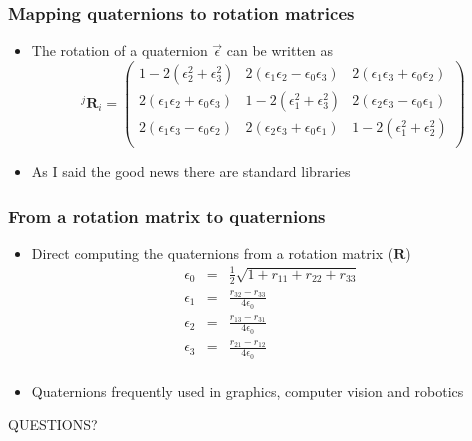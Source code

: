 \documentclass[10pt]{beamer}
\begin{document}
\begin{frame}
  \frametitle{Mapping quaternions to rotation matrices}
  \begin{itemize}
  \item The rotation of a quaternion $\vec{\epsilon}$ can be written as
    \[
      ~^{j}\mathbf{R}_i = \left(
        \begin{array}{ccc}
          1 - 2( \epsilon_2^2 + \epsilon_3^2) & 2 ( \epsilon_1 \epsilon_2 - \epsilon_0 \epsilon_3 ) & 2 ( \epsilon_1 \epsilon_3 + \epsilon_0 \epsilon_2 ) \\
          2 ( \epsilon_1 \epsilon_2 + \epsilon_0 \epsilon_3  ) & 1 - 2 (\epsilon_1^2 + \epsilon_3^2) & 2 ( \epsilon_2 \epsilon_3 - \epsilon_0 \epsilon_1 ) \\
          2 ( \epsilon_1 \epsilon_3 - \epsilon_0 \epsilon_2 ) & 2 ( \epsilon_2 \epsilon_3 + \epsilon_0 \epsilon_1 ) & 1 - 2 (\epsilon_1^2 + \epsilon_2^2) \\
        \end{array} \right)
    \]
  \item As I said the good news there are standard libraries
  \end{itemize}
\end{frame}

\begin{frame}
  \frametitle{From a rotation matrix to quaternions}
  \begin{itemize}
  \item Direct computing the quaternions from a rotation matrix ($\mathbf{R}$)
    \[
      \begin{array}{ccc}
        \epsilon_0 & = & \frac{1}{2} \sqrt{ 1 + r_{11} + r_{22} + r_{33} }\\
        \epsilon_1 & = & \frac{r_{32} - r_{33}}{4 \epsilon_0}\\
        \epsilon_2 & = & \frac{r_{13} - r_{31}}{4 \epsilon_0}\\
        \epsilon_3 & = & \frac{r_{21} - r_{12}}{4 \epsilon_0}\\        
      \end{array}
    \]
  \item Quaternions frequently used in graphics, computer vision and robotics
  \end{itemize}
\end{frame}


\begin{frame}
  \centerline{\Huge QUESTIONS?}
\end{frame}
\end{document}
